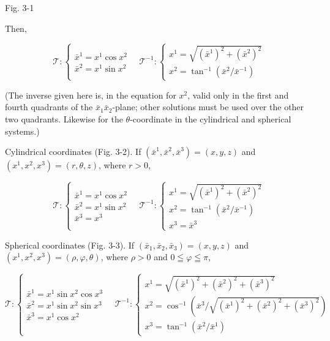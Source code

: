 \documentclass[10pt]{article}
\begin{document}
Fig. 3-1

Then,

\[
\mathscr{T}:\left\{\begin{array}{l}
\bar{x}^{1}=x^{1} \cos x^{2}  \tag{3.2}\\
\bar{x}^{2}=x^{1} \sin x^{2}
\end{array} \quad \mathscr{T}^{-1}:\left\{\begin{array}{l}
x^{1}=\sqrt{\left(\bar{x}^{1}\right)^{2}+\left(\bar{x}^{2}\right)^{2}} \\
x^{2}=\tan ^{-1}\left(\bar{x}^{2} / \bar{x}^{-1}\right)
\end{array}\right.\right.
\]

(The inverse given here is, in the equation for $x^{2}$, valid only in the first and fourth quadrants of the $\bar{x}_{1} \bar{x}_{2}$-plane; other solutions must be used over the other two quadrants. Likewise for the $\theta$-coordinate in the cylindrical and spherical systems.)

Cylindrical coordinates (Fig. 3-2). If $\left(\bar{x}^{1}, \bar{x}^{2}, \bar{x}^{3}\right)=(x, y, z)$ and $\left(x^{1}, x^{2}, x^{3}\right)=(r, \theta, z)$, where $r>0$,

\[
\mathscr{T}:\left\{\begin{array}{l}
\bar{x}^{1}=x^{1} \cos x^{2}  \tag{3.3}\\
\bar{x}^{2}=x^{1} \sin x^{2} \\
\bar{x}^{3}=x^{3}
\end{array} \quad \mathscr{T}^{-1}:\left\{\begin{array}{l}
x^{1}=\sqrt{\left(\bar{x}^{1}\right)^{2}+\left(\bar{x}^{2}\right)^{2}} \\
x^{2}=\tan ^{-1}\left(\bar{x}^{2} / \bar{x}^{-1}\right) \\
x^{3}=\bar{x}^{3}
\end{array}\right.\right.
\]

Spherical coordinates (Fig. 3-3). If $\left(\bar{x}_{1}, \bar{x}_{2}, \bar{x}_{3}\right)=(x, y, z)$ and $\left(x^{1}, x^{2}, x^{3}\right)=(\rho, \varphi, \theta)$, where $\rho>0$ and $0 \leqq \varphi \leqq \pi$,

\[
\mathscr{T}:\left\{\begin{array}{l}
\bar{x}^{1}=x^{1} \sin x^{2} \cos x^{3}  \tag{3.4}\\
\bar{x}^{2}=x^{1} \sin x^{2} \sin x^{3} \\
\bar{x}^{3}=x^{1} \cos x^{2}
\end{array} \quad \mathscr{T}^{-1}:\left\{\begin{array}{l}
x^{1}=\sqrt{\left(\bar{x}^{1}\right)^{2}+\left(\bar{x}^{2}\right)^{2}+\left(\bar{x}^{3}\right)^{2}} \\
x^{2}=\cos ^{-1}\left(\bar{x}^{3} / \sqrt{\left(\bar{x}^{1}\right)^{2}+\left(\bar{x}^{2}\right)^{2}+\left(\bar{x}^{3}\right)^{2}}\right) \\
x^{3}=\tan ^{-1}\left(\bar{x}^{2} / \bar{x}^{1}\right)
\end{array}\right.\right.
\]
\end{document}
